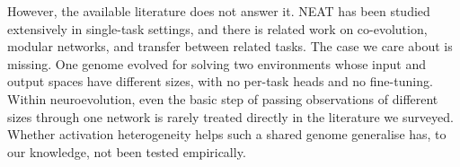 \documentclass[12pt]{article}
\newcommand{\revGram}[2]{#2}
\begin{document}

% 

\revGram{G-13}{However, the available literature does not answer it.}
NEAT has been studied extensively in single-task settings, and there is related work on co-evolution, modular networks, and transfer between related tasks.
The case we care about is missing. One genome evolved for solving two environments whose input and output spaces have different sizes, with no per-task heads and no fine-tuning.
Within neuroevolution, even the basic step of passing observations of different sizes through one network is rarely treated directly in the literature we surveyed.
Whether activation heterogeneity helps such a shared genome generalise has, to our knowledge, not been tested empirically.
\end{document}
